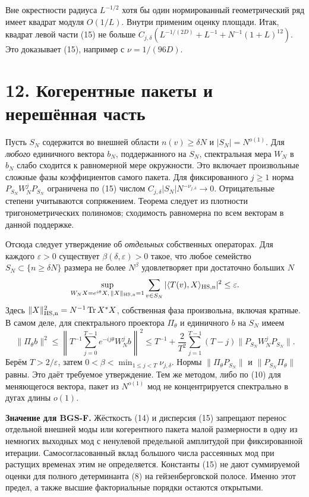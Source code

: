 \documentclass[11pt,a4paper]{article}
\newcommand{\Tr}{\operatorname{Tr}}
\newcommand{\sect}[1]{\section*{\sffamily\color{ink}#1}}
\newcommand{\subt}[1]{\par\medskip\noindent\textbf{#1.}\quad}
\begin{document}
Вне окрестности радиуса $L^{-1/2}$ хотя бы один нормированный геометрический ряд имеет квадрат модуля $O(1/L)$. Внутри применим оценку площади. Итак, квадрат левой части (15) не больше $C_{j,\delta}(L^{-1/(2D)}+L^{-1}+N^{-1}(1+L)^{12})$. Это доказывает (15), например с $\nu=1/(96D)$.

\newpage
\sect{12. Когерентные пакеты и нерешённая часть}
Пусть $S_N$ содержится во внешней области $n(v)\ge\delta N$ и $|S_N|=N^{o(1)}$. Для \emph{любого} единичного вектора $b_N$, поддержанного на $S_N$, спектральная мера $W_N$ в $b_N$ слабо сходится к равномерной мере окружности. Это включает произвольные сложные фазы коэффициентов самого пакета. Для фиксированного $j\ge1$ норма $P_{S_N}W_N^j P_{S_N}$ ограничена по (15) числом $C_{j,\delta}|S_N|N^{-\nu_{j,\delta}}\to0$. Отрицательные степени учитываются сопряжением. Теорема следует из плотности тригонометрических полиномов; сходимость равномерна по всем векторам в данной поддержке.

Отсюда следует утверждение об \emph{отдельных} собственных операторах. Для каждого $\varepsilon>0$ существует $\beta(\delta,\varepsilon)>0$ такое, что любое семейство $S_N\subset\{n\ge\delta N\}$ размера не более $N^\beta$ удовлетворяет при достаточно больших $N$
\[
 \sup_{W_N X=e^{i\theta}X,\,\|X\|_{\rm HS,n}=1}
              \sum_{v\in S_N}|\langle T(v),X\rangle_{\rm HS,n}|^2
 \le\varepsilon .
\]
Здесь $\|X\|_{\rm HS,n}^2=N^{-1}\Tr X^*X$, собственная фаза произвольна, включая кратные. В самом деле, для спектрального проектора $\Pi_\theta$ и единичного $b$ на $S_N$ имеем
\[
 \|\Pi_\theta b\|^2\le
 \left\|T^{-1}\sum_{j=0}^{T-1}e^{-ij\theta} W_N^jb\right\|^2
 \le T^{-1}+\frac{2}{T^2}\sum_{j=1}^{T-1}(T-j)
                       \|P_{S_N}W_N^jP_{S_N}\|.
\]
Берём $T>2/\varepsilon$, затем $0<\beta<\min_{1\le j<T}\nu_{j,\delta}$. Нормы $\|\Pi_\theta P_{S_N}\|$ и $\|P_{S_N}\Pi_\theta\|$ равны. Это даёт требуемое утверждение. Тем же методом, либо по (10) для меняющегося вектора, пакет из $N^{o(1)}$ мод не концентрируется спектрально в дугах длины $o(1)$.

\subt{Значение для BGS-F} Жёсткость (14) и дисперсия (15) запрещают перенос отдельной внешней моды или когерентного пакета малой размерности в одну из немногих выходных мод с ненулевой предельной амплитудой при фиксированной итерации. Самосогласованный вклад большого числа рассеянных мод при растущих временах этим не определяется. Константы (15) не дают суммируемой оценки для полного детерминанта (8) на гейзенберговской полосе. Именно этот предел, а также высшие факториальные порядки остаются открытыми.
\end{document}
